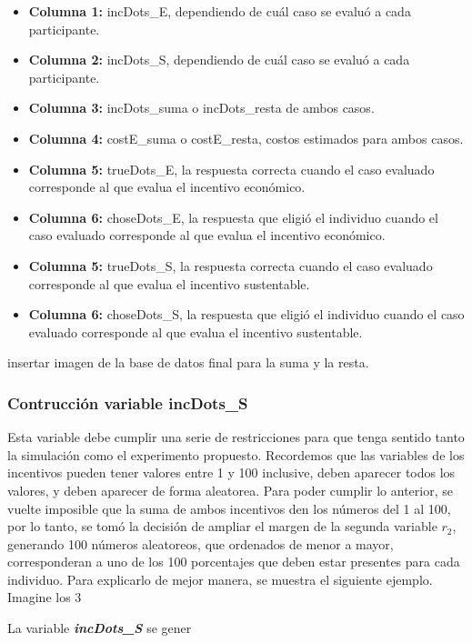 \documentclass[11pt,letterpaper]{article}
\begin{document}
\begin{itemize}
    \item \textbf{Columna 1:} incDots\_E, dependiendo de cuál caso se evaluó a cada participante.
    \item \textbf{Columna 2:} incDots\_S, dependiendo de cuál caso se evaluó a cada participante.
    \item \textbf{Columna 3:} incDots\_suma o incDots\_resta de ambos casos.
    \item \textbf{Columna 4:} costE\_suma o costE\_resta, costos estimados para ambos casos.
    \item \textbf{Columna 5:} trueDots\_E, la respuesta correcta cuando el caso evaluado corresponde al que evalua el incentivo económico. 
    \item \textbf{Columna 6:} choseDots\_E, la respuesta que eligió el individuo cuando el caso evaluado corresponde al que evalua el incentivo económico.
    \item \textbf{Columna 5:} trueDots\_S, la respuesta correcta cuando el caso evaluado corresponde al que evalua el incentivo sustentable. 
    \item \textbf{Columna 6:} choseDots\_S, la respuesta que eligió el individuo cuando el caso evaluado corresponde al que evalua el incentivo sustentable.
\end{itemize}

insertar imagen de la base de datos final para la suma y la resta.

\subsubsection{Contrucción variable incDots\_S}

Esta variable debe cumplir una serie de restricciones para que tenga sentido tanto la simulación como el experimento propuesto. Recordemos que las variables de los incentivos pueden tener valores entre 1 y 100 inclusive, deben aparecer todos los valores, y deben aparecer de forma aleatorea. Para poder cumplir lo anterior, se vuelte imposible que la suma de ambos incentivos den los números del 1 al 100, por lo tanto, se tomó la decisión de ampliar el margen de la segunda variable $r_2$, generando 100 números aleatoreos, que ordenados de menor a mayor, corresponderan a uno de los 100 porcentajes que deben estar presentes para cada individuo. Para explicarlo de mejor manera, se muestra el siguiente ejemplo. Imagine los 3 

La variable \textbf{\textit{incDots\_S}} se gener
\end{document}

